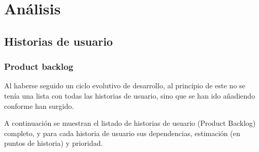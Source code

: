 \chapter{Análisis}

\section{Historias de usuario}

\subsection{Product backlog}

Al haberse seguido un ciclo evolutivo de desarrollo, al principio de este no se tenía una lista con todas las historias de usuario, sino que se han ido añadiendo conforme han surgido.

A continuación se muestran el listado de historias de usuario (Product Backlog) completo, y para cada historia de usuario sus dependencias, estimación (en puntos de historia) y prioridad.



